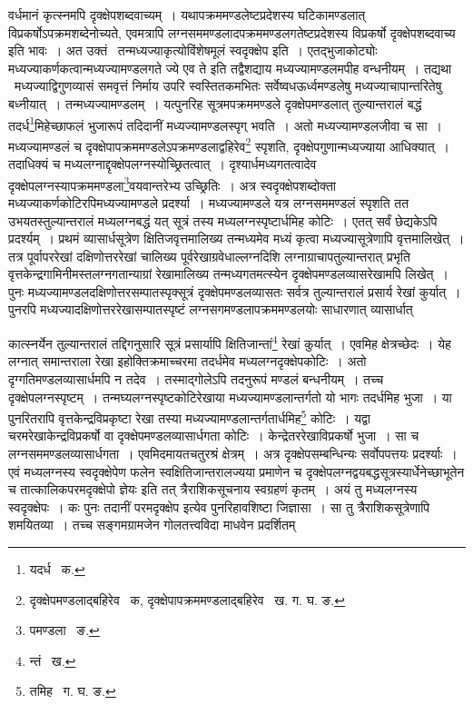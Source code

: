 \documentclass[11pt, openany]{book}
\begin{document}
\noindent वर्धमानं कृत्स्नमपि दृक्क्षेपशब्दवाच्यम्~। यथापक्रममण्डलेष्टप्रदेशस्य घटिकामण्डलात् विप्रकर्षोऽपक्रमशब्देनोच्यते, एवमत्रापि लग्नसममण्डलादपक्रममण्डलगतेष्टप्रदेशस्य विप्रकर्षो दृक्क्षेपशब्दवाच्य इति भावः~। अत उक्तं \textendash\ {\qt तन्मध्यज्याकृत्योविंशेषमूलं स्वदृक्क्षेप} इति~। एतद्भुजाकोट्योः मध्यज्याकर्णकत्वान्मध्यज्यामण्डलगते ज्ये एव ते इति तद्वैशद्याय मध्यज्यामण्डलमपीह वन्धनीयम्~। तद्यथा \textendash\ मध्यज्याद्विगुणव्यासं समवृत्तं निर्माय उपरि स्वस्तितकमभितः सर्वेष्वधऊर्ध्वमण्डलेषु मध्यज्याचापान्तरितेषु बध्नीयात्~। तन्मध्यज्यामण्डलम्~। यत्पुनरिह सूत्रमपक्रममण्डले दृक्क्षेपमण्डलात् तुल्यान्तरालं बद्धं तदर्ध\renewcommand{\thefootnote}{१}\footnote{यदर्ध \textendash\ क.}मिहेच्छाफलं भुजारूपं तदिदानीं 
मध्यज्यामण्डलस्पृग् भवति~। अतो मध्यज्यामण्डलजीवा च सा~। मध्यज्यामण्डलं च दृक्क्षेपापक्रममण्डलेऽपक्रमण्डलाद्वहिरेव\renewcommand{\thefootnote}{२}\footnote{दृक्क्षेपमण्डलाद्बहिरेव \textendash\ क, दृक्क्षेपापक्रममण्डलाद्बहिरेव \textendash\ ख. ग. घ. ङ.} स्पृशति, दृक्क्षेपगुणान्मध्यज्याया आधिक्यात्~। तदाधिक्यं च मध्यलग्नाद्दृक्क्षेपलग्नस्योच्छ्रितत्वात्~। दृश्यार्धमध्यगतत्वादेव दृक्क्षेपलग्नस्यापक्रममण्डला\renewcommand{\thefootnote}{३}\footnote{पमण्डला \textendash\ ङ.}वयवान्तरेभ्य उच्छ्रितिः~। अत्र स्वदृक्क्षेपशब्दोक्ता मध्यज्याकर्णकोटिरपिमध्यज्यामण्डले प्रदर्श्या~। मध्यज्यामण्डले यत्र लग्नसममण्डलं स्पृशति तत उभयतस्तुल्यान्तरालं मध्यलग्नबद्धं यत् सूत्रं तस्य मध्यलग्नस्पृष्टार्धमिह कोटिः~। एतत् सर्वं छेद्यकेऽपि प्रदर्श्यम्~। प्रथमं व्यासार्धसूत्रेण क्षितिजवृत्तमालिख्य तन्मध्यमेव मध्यं कृत्वा मध्यज्यासूत्रेणापि वृत्तमालिखेत्~। तत्र पूर्वापररेखां दक्षिणोत्तररेखां चालिख्य पूर्वरेखाग्रवेधाल्लग्नदिशि लग्नाग्राचापतुल्यान्तरात् प्रभृति वृत्तकेन्द्रगामिनीमस्तलग्नगतान्याग्रां रेखामालिख्य तन्मध्यगतमत्स्येन दृक्क्षेपमण्डलव्यासरेखामपि लिखेत्~। पुनः मध्यज्यामण्डलदक्षिणोत्तरसम्पातस्पृक्सूत्रं दृक्क्षेपमण्डलव्यासतः सर्वत्र तुल्यान्तरालं प्रसार्य रेखां कुर्यात्~। पुनरपि मध्यज्यादक्षिणोत्तररेखासम्पातस्पृष्टं लग्नसगमण्डलापक्रममण्डलयोः साधारणात् व्यासार्धात् 

\newpage

\noindent कात्स्नर्येन तुल्यान्तरालं तद्दिगनुसारि सूत्रं प्रसार्यापि क्षितिजान्तां\renewcommand{\thefootnote}{१}\footnote{न्तं \textendash\ ख.} रेखां कुर्यात्~। एवमिह क्षेत्रच्छेदः~। येह लग्नात् समान्तराला रेखा इहोक्तिक्रमाच्चरमा तदर्धमेव मध्यलग्नदृक्क्षेपकोटिः~। अतो दृग्गतिमण्डलव्यासार्धमपि न तदेव~। तस्माद्गोलेऽपि तदनुरूपं मण्डलं बन्धनीयम्~। तच्च दृक्क्षेपलग्नस्पृष्टम्~। तन्मघ्यलग्नस्पृष्टकोटिरेखाया मध्यज्यामण्डलान्तर्गतो यो भागः तदर्धमिह भुजा~। या पुनरितरापि वृत्तकेन्द्रविप्रकृष्टा रेखा तस्या मध्यज्यामण्डलान्तर्गतार्धमिह\renewcommand{\thefootnote}{२}\footnote{तमिह \textendash\ ग. घ. ङ.} कोटिः~। यद्वा चरमरेखाकेन्द्रविप्रकर्षो वा दृक्क्षेपमण्डलव्यासार्धगता कोटिः~। केन्द्रेतररेखाविप्रकर्षो भुजा~। सा च लग्नसममण्डलव्यासार्धगता~। एवमिदमायतचतुरश्रं क्षेत्रम्~। अत्र दृक्क्षेपसम्बन्धिन्यः सर्वोपपत्तयः प्रदर्श्याः~। एवं मध्यलग्नस्य स्वदृक्क्षेपेण
फलेन स्वक्षितिजान्तरालज्यया प्रमाणेन च दृक्क्षेपलग्नद्वयबद्धसूत्रस्यार्धेनेच्छाभूतेन च तात्कालिकपरमदृक्क्षेपो ज्ञेयः इति तत् त्रैराशिकसूचनाय स्वग्रहणं कृतम्~। अयं तु मध्यलग्नस्य स्वदृक्क्षेपः~। कः पुनः तदानीं परमदृक्क्षेप इत्येव पुनरिहावशिष्टा जिज्ञासा~। सा तु त्रैराशिकसूत्रेणापि शमयितव्या~। तच्च सङ्गमग्रामजेन गोलतत्त्वविदा माधवेन प्रदर्शितम्\textendash  
\end{document}

